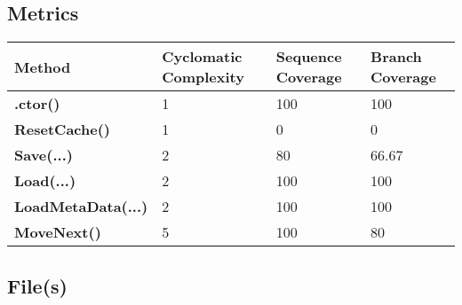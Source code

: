 \documentclass[a4paper,10pt]{article}
\begin{document}
\subsection{Metrics}
\begin{longtable}[l]{|l|l|l|l|}
\hline
\textbf{Method} & \textbf{Cyclomatic Complexity} & \textbf{Sequence Coverage} & \textbf{Branch Coverage}\\
\hline
\textbf{.ctor()} & 1 & 100 & 100\\
\hline
\textbf{ResetCache()} & 1 & 0 & 0\\
\hline
\textbf{Save(...)} & 2 & 80 & 66.67\\
\hline
\textbf{Load(...)} & 2 & 100 & 100\\
\hline
\textbf{LoadMetaData(...)} & 2 & 100 & 100\\
\hline
\textbf{MoveNext()} & 5 & 100 & 80\\
\hline
\end{longtable}
\subsection{File(s)}
\end{document}
